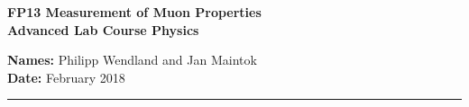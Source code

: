 \begin{centering}
  \vspace*{-10pt}
  \LARGE{\textbf{FP13 Measurement of Muon Properties\\ Advanced Lab Course Physics}}\\
  \vspace*{20pt}

\normalsize{\textbf{Names:} Philipp Wendland and Jan Maintok} \\
\textbf{Date: } February 2018 \\
 
 \end{centering}

 \vspace*{8pt}

 \rule{\textwidth}{1pt}

 \vspace*{20pt}
